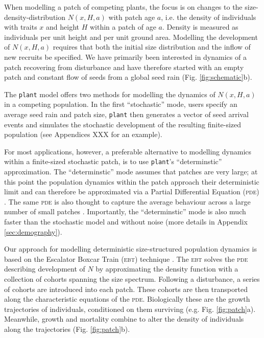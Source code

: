 \documentclass[a4paper,11pt]{article}
\newcommand{\plant}{\texttt{plant}}
\begin{document}
When modelling a patch of competing plants, the focus is on changes to the size-
density-distribution \(N(x, H, a)\) with patch age \(a\), i.e. the density of
individuals with traits \(x\) and height \(H\) within a patch of age \(a\).
Density is measured as individuals per unit height and per unit ground area.
Modelling the development of  \(N(x, H, a)\) requires that both the initial size
distribution and the inflow of new recruits be specified. We have primarily
been interested in dynamics of a patch recovering from disturbance and have
therefore started with an empty patch and constant flow of seeds from a global
seed rain (Fig. \ref{fig:schematic}b).

The {\plant} model offers two methods for modelling the dynamics of \(N(x,
H, a)\) in a competing population. In the first ``stochastic'' mode, users
specify an average seed rain and patch size, {\plant} then generates a
vector of seed arrival events and simulates the stochastic
development of the resulting finite-sized population (see Appendices XXX for an
example).

For most applications, however, a preferable alternative to modelling
dynamics within a finite-sized stochastic patch, is to use {\plant}'s 
``determinstic'' approximation. The ``determinstic'' mode assumes that
patches are very large; at this point the population dynamics within the
patch approach their deterministic limit and can therefore
be approximated via a Partial Differential Equation (\textsc{pde})
\citep{Deroos-1997, Kohyama-1993}.  The same \textsc{pde} is also thought to
capture the average behaviour across a large number of small patches
\citep{Moorcroft-2001}. Importantly, the ``determinstic'' mode is
also much faster than the stochastic model and without noise (more
details in Appendix \ref{sec:demography}).

Our approach for modelling deterministic size-structured population dynamics is
based on the Escalator Boxcar Train (\textsc{ebt}) technique
\citep{Deroos-1988, Deroos-1992, Deroos-1997}. The \textsc{ebt} solves
the \textsc{pde} describing development of \(N\) by approximating the
density function with a collection of cohorts spanning the size
spectrum. Following a disturbance, a series of cohorts are introduced
into each patch. These cohorts are then transported along the
characteristic equations of the \textsc{pde}. Biologically these are
the growth trajectories of individuals, conditioned on them surviving
(e.g. Fig. \ref{fig:patch}a). Meanwhile, growth and mortality combine
to alter the density of individuals along the trajectories
(Fig. \ref{fig:patch}b).
\end{document}
